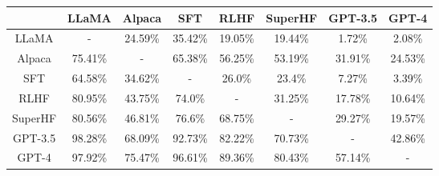 \begin{tabular}{|c|c|c|c|c|c|c|c|}
\hline
 & LLaMA & Alpaca & SFT & RLHF & SuperHF & GPT-3.5 & GPT-4 \\
\hline
LLaMA & - & 24.59\% & 35.42\% & 19.05\% & 19.44\% & 1.72\% & 2.08\% \\
\hline
Alpaca & 75.41\% & - & 65.38\% & 56.25\% & 53.19\% & 31.91\% & 24.53\% \\
\hline
SFT & 64.58\% & 34.62\% & - & 26.0\% & 23.4\% & 7.27\% & 3.39\% \\
\hline
RLHF & 80.95\% & 43.75\% & 74.0\% & - & 31.25\% & 17.78\% & 10.64\% \\
\hline
SuperHF & 80.56\% & 46.81\% & 76.6\% & 68.75\% & - & 29.27\% & 19.57\% \\
\hline
GPT-3.5 & 98.28\% & 68.09\% & 92.73\% & 82.22\% & 70.73\% & - & 42.86\% \\
\hline
GPT-4 & 97.92\% & 75.47\% & 96.61\% & 89.36\% & 80.43\% & 57.14\% & - \\
\hline
\end{tabular}
